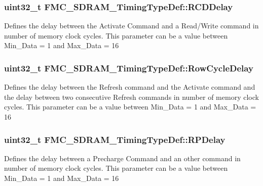 \subsubsection[{\texorpdfstring{R\+C\+D\+Delay}{RCDDelay}}]{\setlength{\rightskip}{0pt plus 5cm}uint32\+\_\+t F\+M\+C\+\_\+\+S\+D\+R\+A\+M\+\_\+\+Timing\+Type\+Def\+::\+R\+C\+D\+Delay}\hypertarget{struct_f_m_c___s_d_r_a_m___timing_type_def_a99beff6ce115b68684c7872a9196e61d}{}\label{struct_f_m_c___s_d_r_a_m___timing_type_def_a99beff6ce115b68684c7872a9196e61d}
Defines the delay between the Activate Command and a Read/\+Write command in number of memory clock cycles. This parameter can be a value between Min\+\_\+\+Data = 1 and Max\+\_\+\+Data = 16 
\subsubsection[{\texorpdfstring{Row\+Cycle\+Delay}{RowCycleDelay}}]{\setlength{\rightskip}{0pt plus 5cm}uint32\+\_\+t F\+M\+C\+\_\+\+S\+D\+R\+A\+M\+\_\+\+Timing\+Type\+Def\+::\+Row\+Cycle\+Delay}\hypertarget{struct_f_m_c___s_d_r_a_m___timing_type_def_ad766564847851a0d5cda78f70a7c7b1e}{}\label{struct_f_m_c___s_d_r_a_m___timing_type_def_ad766564847851a0d5cda78f70a7c7b1e}
Defines the delay between the Refresh command and the Activate command and the delay between two consecutive Refresh commands in number of memory clock cycles. This parameter can be a value between Min\+\_\+\+Data = 1 and Max\+\_\+\+Data = 16 
\subsubsection[{\texorpdfstring{R\+P\+Delay}{RPDelay}}]{\setlength{\rightskip}{0pt plus 5cm}uint32\+\_\+t F\+M\+C\+\_\+\+S\+D\+R\+A\+M\+\_\+\+Timing\+Type\+Def\+::\+R\+P\+Delay}\hypertarget{struct_f_m_c___s_d_r_a_m___timing_type_def_a499042750059231bf7fc5bf9fc2c46aa}{}\label{struct_f_m_c___s_d_r_a_m___timing_type_def_a499042750059231bf7fc5bf9fc2c46aa}
Defines the delay between a Precharge Command and an other command in number of memory clock cycles. This parameter can be a value between Min\+\_\+\+Data = 1 and Max\+\_\+\+Data = 16 
